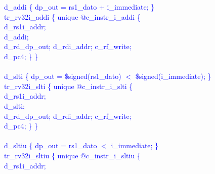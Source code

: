 \textcolor{blue}{
\indent d\_addi \{ dp\_out = rs1\_dato + i\_immediate; \}\\%
\indent tr\_rv32i\_addi \{ unique @c\_instr\_i\_addi \{ \\%
\indent \hspace{\parindent} d\_rs1i\_addr; \\%
\indent \hspace{\parindent} d\_addi; \\%
\indent \hspace{\parindent} d\_rd\_dp\_out; d\_rdi\_addr; c\_rf\_write;  \\%
\indent \hspace{\parindent} d\_pc4; \} \} \\%
\\
\indent d\_slti \{ dp\_out = \$signed(rs1\_dato) $<$ \$signed(i\_immediate); \}\\%
\indent tr\_rv32i\_slti \{ unique @c\_instr\_i\_slti \{ \\%
\indent \hspace{\parindent} d\_rs1i\_addr; \\%
\indent \hspace{\parindent} d\_slti; \\%
\indent \hspace{\parindent} d\_rd\_dp\_out; d\_rdi\_addr; c\_rf\_write;  \\%
\indent \hspace{\parindent} d\_pc4; \} \} \\%
\\
\indent d\_sltiu \{ dp\_out = rs1\_dato $<$ i\_immediate; \}\\%
\indent tr\_rv32i\_sltiu \{ unique @c\_instr\_i\_sltiu \{ \\%
\indent \hspace{\parindent} d\_rs1i\_addr; \\%
}
